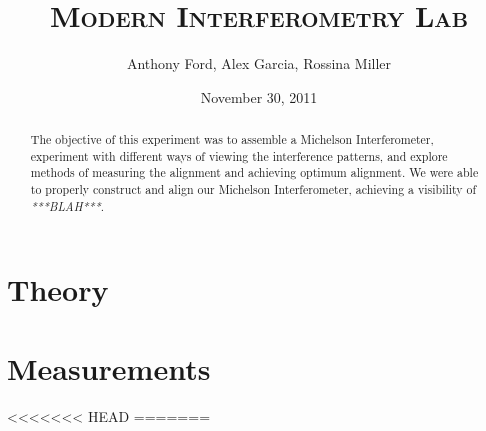 \documentclass[12pt,titlepage,final]{article}
\begin{document}
\title{\textsc{Modern Interferometry Lab}}
\author{Anthony Ford, Alex Garcia, Rossina Miller}
\date{November 30, 2011}
\maketitle

\clearpage

\begin{abstract}
The objective of this experiment was to assemble a Michelson Interferometer,
experiment with different ways of viewing the interference patterns, and explore
methods of measuring the alignment and achieving optimum alignment. We were able
to properly construct and align our Michelson Interferometer, achieving a
visibility of \emph{***BLAH***}.
\end{abstract}



\section{Theory}






\section{Measurements}

<<<<<<< HEAD
=======
\end{document}
